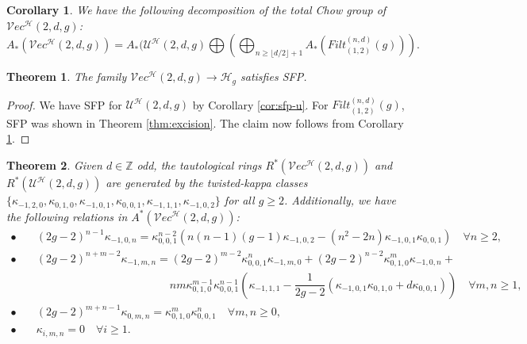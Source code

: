 \documentclass[11pt]{amsart}
\newcommand\Z{\mathbb{Z}}
\newtheorem{theorem}{Theorem}[section]
\newtheorem{corollary}{Corollary}[theorem]
\theoremstyle{definition}
\newcommand{\ri}{\rightarrow}
\newcommand{\h}{\mathcal{H}}
\newcommand{\U}{\mathscr{U}}
\newcommand{\ve}{\mathcal{V}ec}
\newcommand{\ka}{\kappa}
\newcommand{\ext}{Filt}
\begin{document}
\begin{corollary}\label{cor:decomp-ve}
	We have the following decomposition of the total Chow group of $\ve^\h(2,d,g)$:
	$$A_*(\ve^\h(2,d,g)) = A_*(\U^\h(2,d,g)\bigoplus \left (\bigoplus_{n\geq \lfloor d/2\rfloor +1} A_*(\ext_{(1,2)}^{(n,d)}(g)) \right ).$$
\end{corollary}
\begin{theorem}\label{thm:sfp-ve}
	The family $\ve^\h(2,d,g)\ri \h_g$ satisfies SFP.
\end{theorem}
\begin{proof}
We have SFP for $\U^\h(2,d,g)$ by Corollary \ref{cor:sfp-u}. For $\ext_{(1,2)}^{(n,d)}(g)$, SFP was shown in Theorem \ref{thm:excision}.
The claim now follows from Corollary \ref{cor:decomp-ve}.
\end{proof}

\begin{theorem}\label{thm:tautological-ve}
	Given $d\in\Z$ odd, the tautological rings $R^*(\ve^\h(2,d,g))$ and $R^*(\U^\h(2,d,g))$ are generated by the twisted-kappa classes $\{\ka_{-1,2,0},\ka_{0,1,0},\ka_{-1,0,1},\ka_{0,0,1},\ka_{-1,1,1},\ka_{-1,0,2}\}$ for all $g\geq 2$.
Additionally, we have the following relations in $A^*(\ve^\h(2,d,g))$:
\begin{align*}
   \bullet \quad& (2g-2)^{n-1}\ka_{-1,0,n} =\ka_{0,0,1}^{n-2}(n(n-1)(g-1)\ka_{-1,0,2}-(n^2-2n)\ka_{-1,0,1}\ka_{0,0,1}) \quad\forall n\geq 2,\\
  \bullet\quad & (2g-2)^{n+m-2} \ka_{-1,m,n} = {(2g-2)^{m-2}}\ka_{0,0,1}^n\ka_{-1,m,0}+{(2g-2)^{n-2}}\ka_{0,1,0}^m\ka_{-1,0,n}+\\
 & \qquad\qquad\qquad\qquad\qquad\qquad nm\ka_{0,1,0}^{m-1}\ka_{0,0,1}^{n-1}(\ka_{-1,1,1}-\dfrac{1}{2g-2}(\ka_{-1,0,1}\ka_{0,1,0}+d\ka_{0,0,1}))\quad \forall m,n\geq 1,
\\\bullet \quad &(2g-2)^{m+n-1}\ka_{0,m,n} = \ka_{0,1,0}^m\ka_{0,0,1}^n\quad \forall m,n\geq 0,\\ 
	\bullet\quad &\ka_{i,m,n} = 0 \quad \forall i\geq 1.
\end{align*}
\end{theorem}
\end{document}
